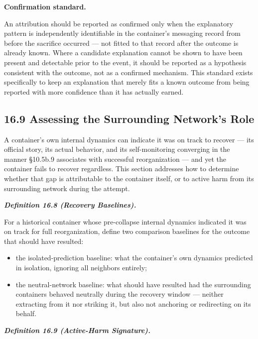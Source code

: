 \documentclass[
]{article}
\begin{document}
\textbf{Confirmation standard.}

An attribution should be reported as confirmed only when the explanatory
pattern is independently identifiable in the container's messaging
record from before the sacrifice occurred --- not fitted to that record
after the outcome is already known. Where a candidate explanation cannot
be shown to have been present and detectable prior to the event, it
should be reported as a hypothesis consistent with the outcome, not as a
confirmed mechanism. This standard exists specifically to keep an
explanation that merely fits a known outcome from being reported with
more confidence than it has actually earned.

\hypertarget{assessing-the-surrounding-networks-role}{%
\subsection{16.9 Assessing the Surrounding Network's
Role}\label{assessing-the-surrounding-networks-role}}

A container's own internal dynamics can indicate it was on track to
recover --- its official story, its actual behavior, and its
self-monitoring converging in the manner §10.5b.9 associates with
successful reorganization --- and yet the container fails to recover
regardless. This section addresses how to determine whether that gap is
attributable to the container itself, or to active harm from its
surrounding network during the attempt.

\emph{\textbf{Definition 16.8 (Recovery Baselines).}}

For a historical container whose pre-collapse internal dynamics
indicated it was on track for full reorganization, define two comparison
baselines for the outcome that should have resulted:

\begin{itemize}
\item
  the isolated-prediction baseline: what the container's own dynamics
  predicted in isolation, ignoring all neighbors entirely;
\item
  the neutral-network baseline: what should have resulted had the
  surrounding containers behaved neutrally during the recovery window
  --- neither extracting from it nor striking it, but also not anchoring
  or redirecting on its behalf.
\end{itemize}

\emph{\textbf{Definition 16.9 (Active-Harm Signature).}}
\end{document}
